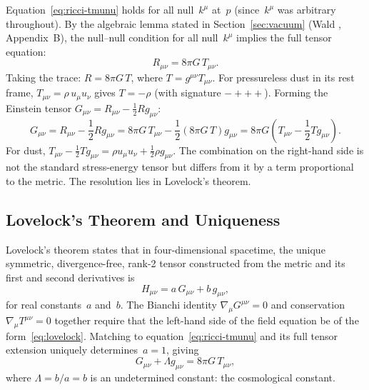 \documentclass[12pt]{article}
\begin{document}
Equation~\eqref{eq:ricci-tmunu} holds for all null~$k^\mu$ at~$p$
(since~$k^\mu$ was arbitrary throughout).
By the algebraic lemma stated in Section~\ref{sec:vacuum}
(Wald \cite{Wald1984}, Appendix~B), the null--null condition
for all null~$k^\mu$ implies the full tensor equation:
\begin{equation}
  R_{\mu\nu} = 8\pi G\,T_{\mu\nu}.
  \label{eq:ricci-full}
\end{equation}
Taking the trace: $R = 8\pi G\,T$, where $T = g^{\mu\nu}T_{\mu\nu}$.
For pressureless dust in its rest frame,
$T_{\mu\nu} = \rho\,u_\mu u_\nu$ gives
$T = -\rho$ (with signature $-+++$).
Forming the Einstein tensor
$G_{\mu\nu} = R_{\mu\nu} - \tfrac{1}{2}Rg_{\mu\nu}$:
\begin{equation}
  G_{\mu\nu}
  = R_{\mu\nu} - \frac{1}{2}Rg_{\mu\nu}
  = 8\pi G\,T_{\mu\nu} - \frac{1}{2}(8\pi G\,T)g_{\mu\nu}
  = 8\pi G\!\left(T_{\mu\nu} - \frac{1}{2}Tg_{\mu\nu}\right).
  \label{eq:einstein-intermediate}
\end{equation}
For dust, $T_{\mu\nu} - \tfrac{1}{2}Tg_{\mu\nu}
= \rho u_\mu u_\nu + \tfrac{1}{2}\rho g_{\mu\nu}$.
The combination on the right-hand side is not the
standard stress-energy tensor but differs from it by a term
proportional to the metric.
The resolution lies in Lovelock's theorem.

\subsection{Lovelock's Theorem and Uniqueness}

Lovelock's theorem \cite{Lovelock1971} states that in
four-dimensional spacetime, the unique symmetric,
divergence-free, rank-2 tensor constructed from the metric
and its first and second derivatives is
\begin{equation}
  H_{\mu\nu} = a\,G_{\mu\nu} + b\,g_{\mu\nu},
  \label{eq:lovelock}
\end{equation}
for real constants~$a$ and~$b$.
The Bianchi identity $\nabla_\mu G^{\mu\nu}=0$ and conservation
$\nabla_\mu T^{\mu\nu}=0$ together require that the left-hand
side of the field equation be of the form~\eqref{eq:lovelock}.
Matching to equation~\eqref{eq:ricci-tmunu} and its full tensor
extension uniquely determines~$a=1$, giving
\begin{equation}
  G_{\mu\nu} + \Lambda g_{\mu\nu} = 8\pi G\,T_{\mu\nu},
  \label{eq:einstein-lambda}
\end{equation}
where $\Lambda = b/a = b$ is an undetermined constant:
the cosmological constant.
\end{document}
